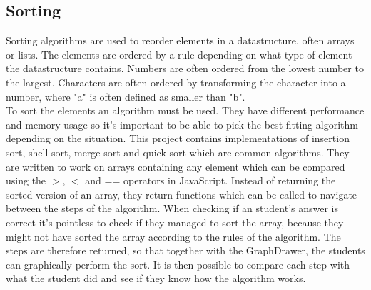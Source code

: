 \subsection{Sorting}
Sorting algorithms are used to reorder elements in a datastructure, often arrays or lists. The elements are ordered by a rule depending on what type of element the datastructure contains. Numbers are often ordered from the lowest number to the largest. Characters are often ordered by transforming the character into a number, where "a" is often defined as smaller than "b".
\\[11pt]
To sort the elements an algorithm must be used. They have different performance and memory usage so it's important to be able to pick the best fitting algorithm depending on the situation. This project contains implementations of insertion sort, shell sort, merge sort and quick sort which are common algorithms. They are written to work on arrays containing any element which can be compared using the $>$, $<$ and == operators in JavaScript. Instead of returning the sorted version of an array, they return functions which can be called to navigate between the steps of the algorithm. When checking if an student's answer is correct it's pointless to check if they managed to sort the array, because they might not have sorted the array according to the rules of the algorithm. The steps are therefore returned, so that together with the GraphDrawer, the students can graphically perform the sort. It is then possible to compare each step with what the student did and see if they know how the algorithm works.








